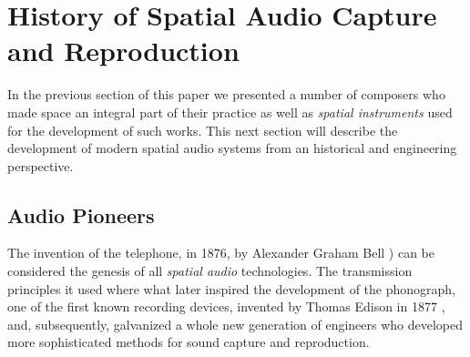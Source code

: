 \section{History of Spatial Audio Capture and Reproduction}

In the previous section of this paper we presented a number of composers who made space an integral part of their practice as well as \textit{spatial instruments} used for the development of such works. This next section will describe the development of modern spatial audio systems from an historical and engineering perspective. 




\subsection{Audio Pioneers} \label{subsec:audio_pioneers}

The invention of the telephone, in 1876, by  Alexander Graham Bell \cite{grosvenor2016alexander}) can be considered the genesis of all \textit{spatial audio} technologies. The transmission principles it used where what later inspired the development of the phonograph, one of the first known recording devices, invented by Thomas Edison in 1877 \cite{gitelman1999scripts}, and, subsequently, galvanized a whole new generation of engineers who developed more sophisticated methods for sound capture and reproduction. 

